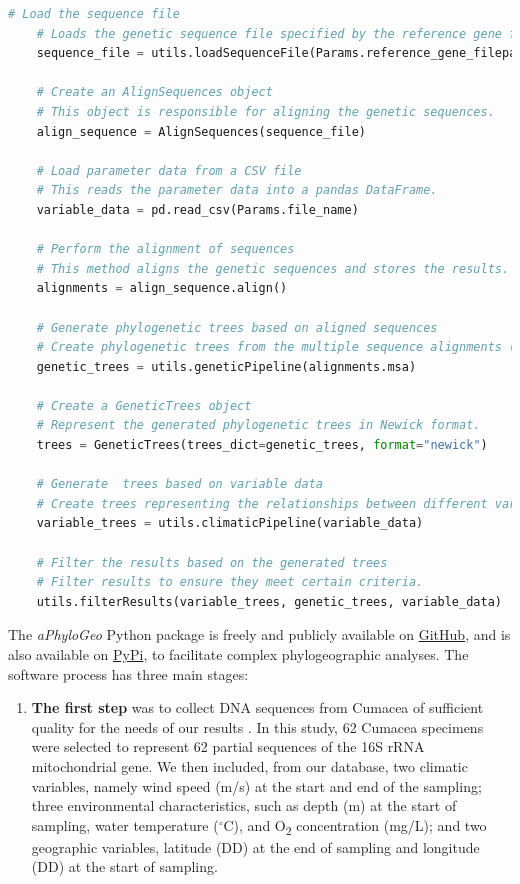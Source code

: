 {\begin{lstlisting}[label=lst:main,language=Python,caption=Main script for tutorial using the aPhyloGeo package.]
    # Load the sequence file
    # Loads the genetic sequence file specified by the reference gene filepath.
    sequence_file = utils.loadSequenceFile(Params.reference_gene_filepath)

    # Create an AlignSequences object
    # This object is responsible for aligning the genetic sequences.
    align_sequence = AlignSequences(sequence_file)

    # Load parameter data from a CSV file
    # This reads the parameter data into a pandas DataFrame.
    variable_data = pd.read_csv(Params.file_name)

    # Perform the alignment of sequences
    # This method aligns the genetic sequences and stores the results.
    alignments = align_sequence.align()

    # Generate phylogenetic trees based on aligned sequences
    # Create phylogenetic trees from the multiple sequence alignments (MSA).
    genetic_trees = utils.geneticPipeline(alignments.msa)

    # Create a GeneticTrees object
    # Represent the generated phylogenetic trees in Newick format.
    trees = GeneticTrees(trees_dict=genetic_trees, format="newick")

    # Generate  trees based on variable data
    # Create trees representing the relationships between different variables.
    variable_trees = utils.climaticPipeline(variable_data)

    # Filter the results based on the generated trees
    # Filter results to ensure they meet certain criteria.
    utils.filterResults(variable_trees, genetic_trees, variable_data)
\end{lstlisting}

The \textit{aPhyloGeo} Python package is freely and publicly available on \href{https://github.com/tahiri-lab/aPhyloGeo}{GitHub}, and is also available on \href{https://pypi.org/project/aphylogeo/}{PyPi}, to facilitate complex phylogeographic analyses. The software process has three main stages:

\begin{enumerate}
\item \textbf{The first step} was to collect DNA sequences from Cumacea of sufficient quality for the needs of our results \citep{koshkarov_phylogeography_2022}. In this study, 62 Cumacea specimens were selected to represent 62 partial sequences of the 16S rRNA mitochondrial gene. We then included, from our database, two climatic variables, namely wind speed (m/s) at the start and end of the sampling; three environmental characteristics, such as depth (m) at the start of sampling, water temperature ($^\circ$C), and O\textsubscript{2} concentration (mg/L); and two geographic variables, latitude (DD) at the end of sampling and longitude (DD) at the start of sampling.


\end{enumerate}}
